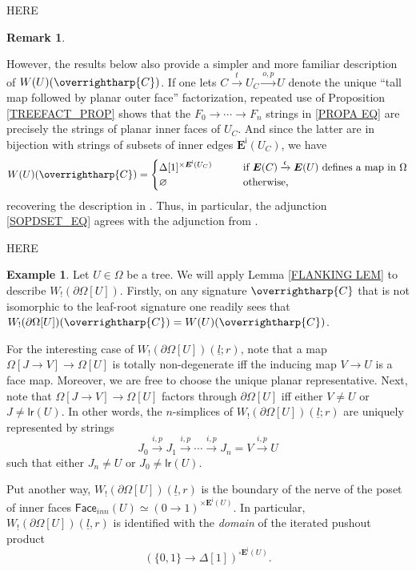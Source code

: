 \documentclass[a4paper,10pt
,draft
]{article}%
\numberwithin{equation}{section}
\numberwithin{figure}{section}
\theoremstyle{definition} %
\newtheorem{example}[equation]{Example}%
\newtheorem{remark}[equation]{Remark}%
\newcommand{\vect}[1]{\text{\overrightharp{\ensuremath{#1}}}}
\newcommand{\1}{\ensuremath{\mathbbm 1}}%
\begin{document}
{\color{red} HERE}


\begin{remark}
	\label{COMPWITHMW_REM}
	
	However, the results below also provide a simpler and more familiar description of $W(U)(\vect{C})$.
	If one lets
	$C \xrightarrow{t} U_C \xrightarrow{o,p} U$
	denote the unique ``tall map followed by planar outer face'' factorization, 
	repeated use of Proposition \ref{TREEFACT_PROP}
	shows that the 
	$F_0 \to \cdots \to F_n$
	strings in \eqref{PROPA EQ}
	are precisely the strings of planar inner faces of $U_C$.
	And since the latter are in bijection with strings of subsets of inner edges $\boldsymbol{E}^{\mathsf{i}}(U_C)$, 
	we have 
	\begin{equation}\label{WU_EQ2}
	W(U)(\vect C) =
	\begin{cases}
	\Delta[1]^{\times \boldsymbol{E}^{\mathsf{i}}(U_{C})}
	\qquad
	&
	\mbox{if $\boldsymbol{E}(C) \xrightarrow{\mathfrak{c}} \boldsymbol{E}(U)$ defines a map in $\Omega$}
	\\
	\varnothing
	&
	\mbox{otherwise,}
	\end{cases}
	\end{equation}
	recovering the description in \cite[\S 4]{CM13b}.
	Thus, in particular, the adjunction \eqref{SOPDSET_EQ} agrees with the adjunction from \cite{CM13b}.
\end{remark}


{\color{red} HERE}


\begin{example}\label{WPARTIALT_EX}
	Let $U \in \Omega$ be a tree.
	We will apply Lemma \ref{FLANKING LEM} to describe
	$W_!(\partial \Omega[U])$.
	Firstly, 
	on any signature $\vect{C}$
	that is not isomorphic to the leaf-root signature
	one readily sees that
	$W_!(\partial \Omega[U])(\vect{C}) = W(U)(\vect{C})$.

	For the interesting case of 
	$W_!(\partial \Omega[U])(\underline{l};r)$,
	note that a map
	$\Omega[J \to V] \to \Omega [U]$
	is totally non-degenerate iff
	the inducing map $V \to U$
	is a face map. 
	Moreover, we are free to choose the unique planar representative.
	Next, note that 
	$\Omega[J \to V] \to \Omega [U]$
	factors through $\partial \Omega[U]$
	iff either $V \neq U$ or $J \neq \mathsf{lr}(U)$.
	In other words, the $n$-simplices of 
	$W_!(\partial \Omega[U])(\underline{l};r)$
	are uniquely represented by strings
\begin{equation}\label{WDELREP EQ}
	J_0 \xrightarrow{i,p} 
	J_1 \xrightarrow{i,p} 
	\cdots \xrightarrow{i,p}
	J_n = V \xrightarrow{i,p} U
\end{equation}
	such that either $J_n \neq U$ or $J_0 \neq \mathsf{lr}(U)$.
	
	Put another way, 
	$W_!(\partial \Omega[U])(\underline{l},r)$
	is the boundary of the nerve of the poset of inner faces
	$\mathsf{Face}_{inn}(U) \simeq 
	(0 \to 1)^{\times \boldsymbol{E}^{\mathsf{i}}(U)}$.
	In particular, 
	$W_!(\partial \Omega[U])(\underline{l},r)$ 
	is identified with the \emph{domain} of the iterated pushout product
	\[
	\left(
	\{0,1\} \to \Delta[1]
	\right)^{\square \boldsymbol{E}^{\mathsf{i}}(U)}.
	\]
\end{example}
\end{document}
